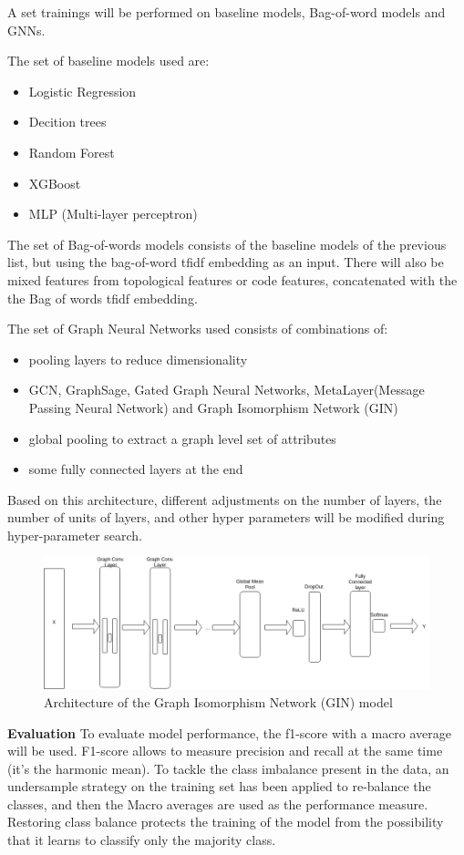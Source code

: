 
A set trainings will be performed on baseline models, Bag-of-word models and GNNs.

The set of baseline models used are:
\begin{itemize}
	\item Logistic Regression
	\item Decition trees
	\item Random Forest
	\item XGBoost
	\item MLP (Multi-layer perceptron)
\end{itemize}

The set of Bag-of-words models consists of the baseline models of the previous list, but using the bag-of-word tfidf embedding as an input. There will also be mixed features from topological features or code features, concatenated with the the Bag of words tfidf embedding.

The set of Graph Neural Networks used consists of combinations of:
\begin{itemize}
	\item pooling layers to reduce dimensionality
	\item GCN, GraphSage, Gated Graph Neural Networks, MetaLayer(Message Passing Neural Network) and Graph Isomorphism Network (GIN)
	\item global pooling to extract a graph level set of attributes
	\item some fully connected layers at the end
\end{itemize}

Based on this architecture, different adjustments on the number of layers, the number of units of layers, and other hyper parameters will be modified during hyper-parameter search.


\begin{figure}[H]
    \centering
        \includegraphics[width=0.85\linewidth]{img/GN_exp2_GIN.png}
    \caption{Architecture of the Graph Isomorphism Network (GIN) model}\label{fig:gin_diagram}
\end{figure}



\textbf{Evaluation}
To evaluate model performance, the f1-score with a macro average will be used. F1-score allows to measure precision and recall at the same time (it's the harmonic mean). To tackle the class imbalance present in the data, an undersample strategy on the training set has been applied to re-balance the classes, and then the Macro averages are used as the performance measure. Restoring class balance protects the training of the model from the possibility that it learns to classify only the majority class.
